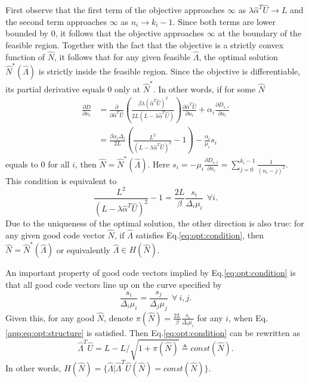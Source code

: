 \documentclass[journal]{IEEEtran}
\newcommand{\rateVec}{\hat{\Lambda}}
\newcommand{\codeVec}{\hat{N}}
\newcommand{\usageVec}{\hat{U}}
\newcommand{\compVec}{\hat{\alpha}}
\begin{document}


\begin{IEEEproof} 
First observe that the first term of the objective approaches $\infty$ as $\lambda\compVec^T\usageVec\rightarrow L$ and the second term approaches $\infty$ as $n_i\rightarrow k_i-1$. Since both terms are lower bounded by 0, it follows that the objective approaches $\infty$ at the boundary of the feasible region. Together with the fact that the objective is a strictly convex function of $\codeVec$, it follows that for any given feasible $\rateVec$,  the optimal solution $\codeVec^*(\rateVec)$ is strictly inside the feasible region. Since the objective is differentiable, its partial derivative equals $0$ only at $\codeVec^*$. In other words, if for some $\codeVec$ 
\begin{align*}
\frac{\partial D}{\partial n_i} &= \frac{\partial}{\partial \compVec^T \usageVec}\left(\frac{\beta \lambda (\compVec^T \usageVec)^2}{2L(L-\lambda \compVec^T \usageVec)}\right) \frac{\partial \compVec^T \usageVec}{\partial n_i} +  \alpha_i\frac{\partial D_{s,i}}{\partial n_i}\\
&= \frac{\beta \alpha_i\Delta_i}{2L}\left(\frac{L^2}{(L-\lambda \compVec^T \usageVec)^2} - 1\right) - \frac{\alpha_i}{\mu_i}s_i
\end{align*}
equals to 0 for all $i$, then $\codeVec = \codeVec^*(\rateVec)$. 
Here $s_i = - \mu_i \frac{\partial D_{s,i}}{\partial n_i} = \sum_{j=0}^{k_i-1} \frac{1}{(n_i-j)^2} $. This condition is equivalent to 
\begin{equation}
\frac{L^2}{(L-\lambda \compVec^T \usageVec)^2} - 1= \frac{2L}{\beta}\frac{s_i}{\Delta_i\mu_i}~~\forall i.
\label{eq:opt:condition}
\end{equation}
Due to the uniqueness of the optimal solution, the other direction is also true: for any given good code vector $\codeVec$, if $\rateVec$ satisfies Eq.\ref{eq:opt:condition}, then $\codeVec = \codeVec^*(\rateVec)$ or equivalently $\rateVec\in H(\codeVec)$. 

An important property of good code vectors implied by Eq.\ref{eq:opt:condition} is that all good code vectors line up on the curve specified by 
\begin{equation}
\frac{s_i}{\Delta_i\mu_i} = \frac{s_j}{\Delta_j\mu_j}~~ \forall~i,j.
\label{app:eq:opt:structure}
\end{equation}
Given this, for any good $\codeVec$, denote $\pi(\codeVec) = \frac{2L}{\beta}\frac{s_i}{\Delta_i\mu_i}$ for any $i$, when Eq.\ref{app:eq:opt:structure} is satisfied. Then Eq.\ref{eq:opt:condition} can be rewritten as
\begin{equation}
\rateVec^T\usageVec = L - L/\sqrt{1+\pi(\codeVec)}\triangleq const(\codeVec).
\end{equation}
In other words,
$H(\codeVec) = \{\rateVec|\rateVec^T\usageVec(\codeVec) = const(\codeVec)\}.$


\end{IEEEproof}
\end{document}
